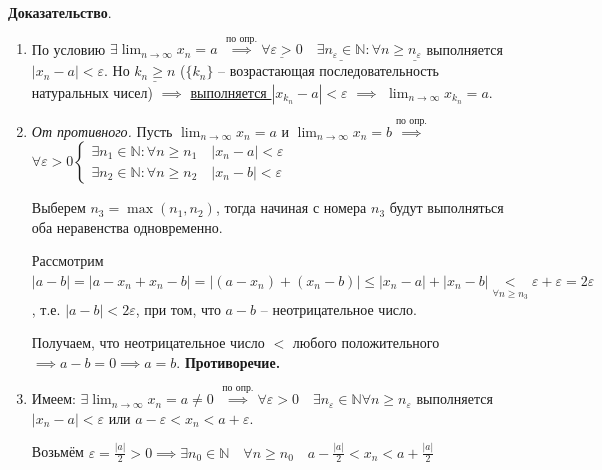 \documentclass[a4paper,oneside]{article}
\newcommand{\bydef}{\stackrel{\text{по опр.}}{\implies}} %
\newcommand{\dslim}{\displaystyle\lim}
\newcommand{\dslimn}{\dslim_{n \to \infty}}
\begin{document}
\textbf{Доказательство}.

\begin{enumerate}
    \item По условию $\exists \dslimn x_n = a$
    $\bydef \underline{\forall \varepsilon > 0}
    \quad \underline{\exists n_\varepsilon \in \mathbb{N}}: 
    \forall n \ge \underline{n_\varepsilon}$ выполняется 
    $\left| x_n - a \right| < \varepsilon$. Но $\underline{k_n \ge n}$
    ($\{k_n\}$ -- возрастающая последовательность натуральных чисел)
    $\implies$ \underline{выполняется $\left| x_{k_n} - a \right| < \varepsilon$}
    $\implies$ $\dslimn x_{k_n} = a$.

    \item \textit{От противного.} Пусть $\dslimn x_n = a$ и
    $\dslimn x_n = b \bydef$
    $\forall \varepsilon > 0 \begin{cases}
        \exists n_1 \in \mathbb{N}: \forall n \ge n_1 \quad \left| x_n - a \right| < \varepsilon \\
        \exists n_2 \in \mathbb{N}: \forall n \ge n_2 \quad \left| x_n - b \right| < \varepsilon
    \end{cases}$

    Выберем $n_3 = \max \left( n_1, n_2 \right)$, тогда начиная с номера $n_3$ будут выполняться оба
    неравенства одновременно.

    Рассмотрим $\left| a - b \right| = \left| a - x_n + x_n - b \right| = 
    \left| (a - x_n) + (x_n - b) \right| \le \left| x_n - a \right| + 
    \left| x_n - b \right| \underset{\forall n \ge n_3}{<}
    \varepsilon + \varepsilon = 2 \varepsilon$, т.е. $\left| a - b \right| < 2 \varepsilon$,
    при том, что $a - b$ -- неотрицательное число.

    Получаем, что неотрицательное число $<$ любого положительного 
    $\implies a - b = 0 \implies a = b$. \textbf{Противоречие.}

    \item Имеем: $\exists \dslimn x_n = a \ne 0$
    $\bydef \forall \varepsilon > 0 \quad \exists n_\varepsilon \in \mathbb{N} 
    \forall n \ge n_\varepsilon$ выполняется $\left| x_n - a \right| < \varepsilon$
    или $a - \varepsilon < x_n < a + \varepsilon$.
    
    Возьмём $\varepsilon = \frac{\left| a \right|}{2} > 0 \implies 
    \exists n_0 \in \mathbb{N} \quad \forall n \ge n_0 \quad
    a - \frac{\left| a \right|}{2} < x_n < a + \frac{\left| a \right|}{2}$


\end{enumerate}
\end{document}
